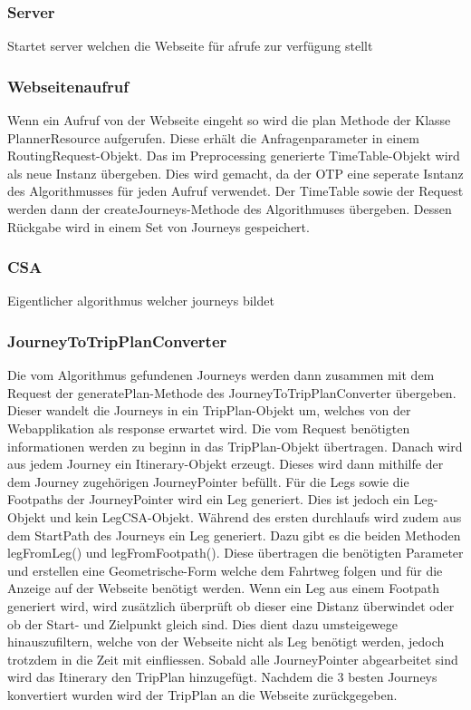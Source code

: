 \subsubsection{Server}
Startet server welchen die Webseite für afrufe zur verfügung stellt
\subsubsection{Webseitenaufruf}
Wenn ein Aufruf von der Webseite eingeht so wird die plan Methode der Klasse PlannerResource aufgerufen. Diese erhält die Anfragenparameter in einem RoutingRequest-Objekt. Das im Preprocessing generierte TimeTable-Objekt wird als neue Instanz übergeben. Dies wird gemacht, da der OTP eine seperate Isntanz des Algorithmusses für jeden Aufruf verwendet. Der TimeTable sowie der Request werden dann der createJourneys-Methode des Algorithmuses übergeben. Dessen Rückgabe wird in einem Set von Journeys gespeichert.

\subsubsection{CSA}
Eigentlicher algorithmus welcher journeys bildet
\subsubsection{JourneyToTripPlanConverter}
Die vom Algorithmus gefundenen Journeys werden dann zusammen mit dem Request der generatePlan-Methode des JourneyToTripPlanConverter übergeben. Dieser wandelt die Journeys in ein TripPlan-Objekt um, welches von der Webapplikation als response erwartet wird.
Die vom Request benötigten informationen werden zu beginn in das TripPlan-Objekt übertragen. Danach wird aus jedem Journey ein Itinerary-Objekt erzeugt. Dieses wird dann mithilfe der dem Journey zugehörigen JourneyPointer befüllt. Für die Legs sowie die Footpaths der JourneyPointer wird ein Leg generiert. Dies ist jedoch ein Leg-Objekt und kein LegCSA-Objekt. Während des ersten durchlaufs wird zudem aus dem StartPath des Journeys ein Leg generiert. Dazu gibt es die beiden Methoden legFromLeg() und legFromFootpath(). Diese übertragen die benötigten Parameter und erstellen eine Geometrische-Form welche dem Fahrtweg folgen und für die Anzeige auf der Webseite benötigt werden. Wenn ein Leg aus einem Footpath generiert wird, wird zusätzlich überprüft ob dieser eine Distanz überwindet oder ob der Start- und Zielpunkt gleich sind. Dies dient dazu umsteigewege hinauszufiltern, welche von der Webseite nicht als Leg benötigt werden, jedoch trotzdem in die Zeit mit einfliessen. Sobald alle JourneyPointer abgearbeitet sind wird das Itinerary den TripPlan hinzugefügt. Nachdem die 3 besten Journeys konvertiert wurden wird der TripPlan an die Webseite zurückgegeben.
